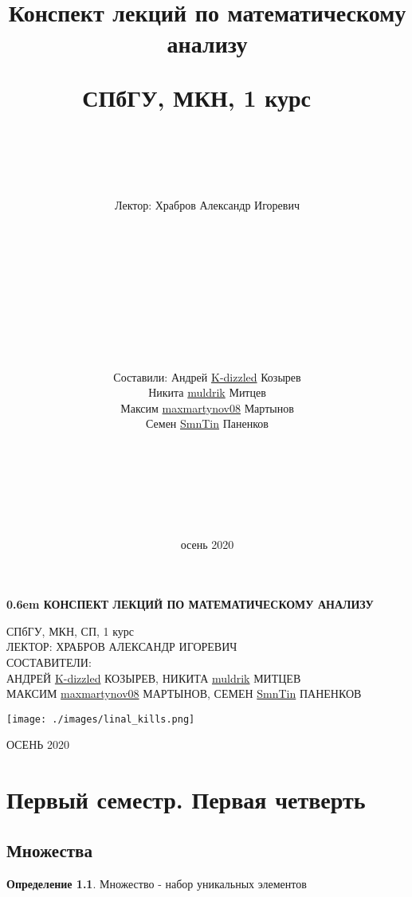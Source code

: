 \documentclass[12pt,letterpaper]{report}
\title{Конспект лекций по математическому анализу

СПбГУ, МКН, 1 курс
\ \\
\ \\ \ \\
}
\author{Лектор: Храбров Александр Игоревич \\
\ \\ \ \\ \ \\ \ \\ \ \\ \ \\ \ \\ \ \\
\ \\ 
\begin{flushright}
Составили: Андрей \href{https://github.com/K-dizzled}{K-dizzled} Козырев \\ Никита  \href{https://github.com/muldrik}{muldrik} Митцев \\ Максим \href{https://github.com/maxmartynov08}{maxmartynov08} Мартынов \\ Семен \href{https://github.com/SmnTin}{SmnTin} Паненков
\end{flushright}
\ \\
\ \\
\ \\
\ \\
\ \\
\ \\}
\date{осень 2020}
\theoremstyle{definition}
\newtheorem*{conj}{Определение}
\begin{document}
\clearpage
\newcommand\nbvspace[1][3]{\vspace*{\stretch{#1}}}
\newcommand\nbstretchyspace{\spaceskip0.5em plus 0.25em minus 0.25em}
\newcommand{\nbtitlestretch}{\spaceskip0.6em}
\pagestyle{empty}
\begin{center}
\bfseries
\nbvspace[1]
\Huge
{\nbtitlestretch\huge
КОНСПЕКТ ЛЕКЦИЙ ПО МАТЕМАТИЧЕСКОМУ АНАЛИЗУ}

\nbvspace[1]
\normalsize

СПбГУ, МКН, СП, 1 курс\\
ЛЕКТОР: ХРАБРОВ АЛЕКСАНДР ИГОРЕВИЧ
\nbvspace[1]
\\
\Large СОСТАВИТЕЛИ:\\[0.5em]
\footnotesize АНДРЕЙ \href{https://github.com/K-dizzled}{K-dizzled} КОЗЫРЕВ, НИКИТА  \href{https://github.com/muldrik}{muldrik} МИТЦЕВ \\ МАКСИМ \href{https://github.com/maxmartynov08}{maxmartynov08} МАРТЫНОВ, СЕМЕН \href{https://github.com/SmnTin}{SmnTin} ПАНЕНКОВ

\nbvspace[2]

\texttt{[image: ./images/linal\_kills.png]}
\nbvspace[3]
\normalsize

\large
ОСЕНЬ 2020
\nbvspace[1]
\end{center}
\fi
\tableofcontents
\newpage
\chapter{Первый семестр. Первая четверть}
\section{Множества}
\begin{conj} Множество - набор уникальных элементов \end{conj}
\end{document}
